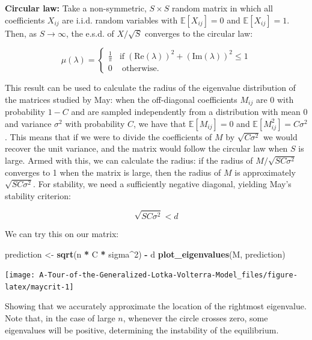 \documentclass[]{book}
\newenvironment{Shaded}{\begin{snugshade}}{\end{snugshade}}
\newcommand{\DecValTok}[1]{\textcolor[rgb]{0.00,0.00,0.81}{#1}}
\newcommand{\KeywordTok}[1]{\textcolor[rgb]{0.13,0.29,0.53}{\textbf{#1}}}
\newcommand{\NormalTok}[1]{#1}
\newcommand{\OperatorTok}[1]{\textcolor[rgb]{0.81,0.36,0.00}{\textbf{#1}}}
\newcommand{\StringTok}[1]{\textcolor[rgb]{0.31,0.60,0.02}{#1}}
\begin{document}
\textbf{Circular law:} Take a non-symmetric, \(S \times S\) random matrix in which all coefficients \(X_{ij}\) are i.i.d. random variables with \(\mathbb E[X_{ij}] = 0\) and \(\mathbb E[X_{ij}] = 1\). Then, as \(S \to \infty\), the e.s.d. of \({X} / \sqrt{S}\) converges to the circular law:

\[
  \mu(\lambda) = \begin{cases}
    \frac{1}{\pi} \; \; \; \text{if} \; (\text{Re}(\lambda))^2 +
    (\text{Im}(\lambda))^2 \leq 1\\
    0 \; \; \;\text{ otherwise}.
  \end{cases}
\]

This result can be used to calculate the radius of the eigenvalue distribution of the matrices studied by May: when the off-diagonal coefficients \(M_{ij}\) are 0 with probability \(1-C\) and are sampled independently from a distribution with mean \(0\) and variance \(\sigma^2\) with probability \(C\), we have that \(\mathbb E[M_{ij}] = 0\) and \(\mathbb E[M_{ij}^2] = C \sigma^2\). This means that if we were to divide the coefficients of \({M}\) by \(\sqrt{C \sigma^2}\) we would recover the unit variance, and the matrix would follow the circular law when \(S\) is large. Armed with this, we can calculate the radius: if the radius of \({M} / \sqrt{S C \sigma^2}\) converges to 1 when the matrix is large, then the radius of \({M}\) is approximately \(\sqrt{S C \sigma^2}\). For stability, we need a sufficiently negative diagonal, yielding May's stability criterion:

\[
\sqrt{S C \sigma^2} < d
\]

We can try this on our matrix:

\begin{Shaded}
\begin{Highlighting}[]
\NormalTok{prediction <-}\StringTok{ }\KeywordTok{sqrt}\NormalTok{(n }\OperatorTok{*}\StringTok{ }\NormalTok{C }\OperatorTok{*}\StringTok{ }\NormalTok{sigma}\OperatorTok{^}\DecValTok{2}\NormalTok{) }\OperatorTok{-}\StringTok{ }\NormalTok{d}
\KeywordTok{plot_eigenvalues}\NormalTok{(M, prediction)}
\end{Highlighting}
\end{Shaded}

\begin{center}\texttt{[image: A-Tour-of-the-Generalized-Lotka-Volterra-Model\_files/figure-latex/maycrit-1]} \end{center}

Showing that we accurately approximate the location of the rightmost eigenvalue. Note that, in the case of large \(n\), whenever the circle crosses zero, some eigenvalues will be positive, determining the instability of the equilibrium.
\end{document}
